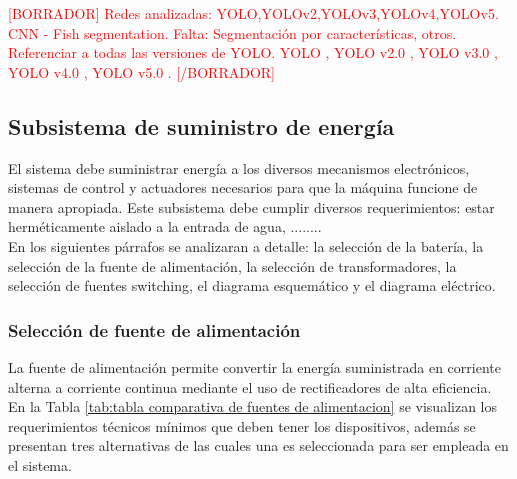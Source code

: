 \textcolor{red}{[BORRADOR] Redes analizadas: YOLO,YOLOv2,YOLOv3,YOLOv4,YOLOv5. CNN - Fish segmentation. Falta: Segmentación por características, otros. \\ Referenciar a todas las versiones de YOLO. YOLO \cite{Redmon2016}, YOLO v2.0 \cite{Redmon2017}, YOLO v3.0 \cite{Redmon2018}, YOLO v4.0 \cite{Solawetz2020}, YOLO v5.0 \cite{bochkovskiy2020yolov4}. [/BORRADOR]}

\subsection{Subsistema de suministro de energía}
\label{ssec:subsistema de suministro de energia}

El sistema debe suministrar energía a los diversos mecanismos electrónicos, sistemas de control y actuadores necesarios para que la máquina funcione de manera apropiada. Este subsistema debe cumplir diversos requerimientos: estar herméticamente aislado a la entrada de agua, ........\\
En los siguientes párrafos se analizaran a detalle: la selección de la batería, la selección de la fuente de alimentación, la selección de transformadores, la selección de fuentes switching, el diagrama esquemático y el diagrama eléctrico.


\subsubsection{Selección de fuente de alimentación} 

La fuente de alimentación permite convertir la energía suministrada en corriente alterna a corriente continua mediante el uso de rectificadores de alta eficiencia. En la Tabla \ref{tab:tabla comparativa de fuentes de alimentacion} se visualizan los requerimientos técnicos mínimos que deben tener los dispositivos, además se presentan tres alternativas de las cuales una es seleccionada para ser empleada en el sistema.

